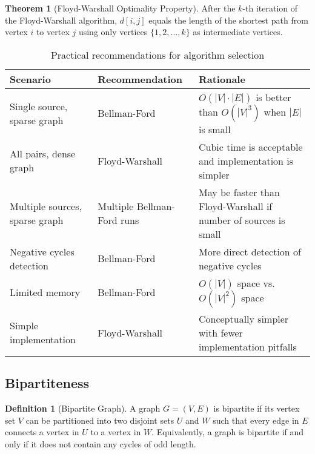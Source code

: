 \documentclass{article}
\theoremstyle{definition}
\newtheorem{theorem}{Theorem}
\newtheorem{definition}{Definition}
\begin{document}
\begin{theorem}[Floyd-Warshall Optimality Property]
After the $k$-th iteration of the Floyd-Warshall algorithm, $d[i,j]$ equals the length of the shortest path from vertex $i$ to vertex $j$ using only vertices $\{1, 2, \ldots, k\}$ as intermediate vertices.
\end{theorem}

\begin{table}[h]
\centering
\begin{tabular}{|p{3cm}|p{5.5cm}|p{5.5cm}|}
\hline
\textbf{Scenario} & \textbf{Recommendation} & \textbf{Rationale} \\
\hline
Single source, sparse graph & Bellman-Ford & $O(|V| \cdot |E|)$ is better than $O(|V|^3)$ when $|E|$ is small \\
\hline
All pairs, dense graph & Floyd-Warshall & Cubic time is acceptable and implementation is simpler \\
\hline
Multiple sources, sparse graph & Multiple Bellman-Ford runs & May be faster than Floyd-Warshall if number of sources is small \\
\hline
Negative cycles detection & Bellman-Ford & More direct detection of negative cycles \\
\hline
Limited memory & Bellman-Ford & $O(|V|)$ space vs. $O(|V|^2)$ space \\
\hline
Simple implementation & Floyd-Warshall & Conceptually simpler with fewer implementation pitfalls \\
\hline
\end{tabular}
\caption{Practical recommendations for algorithm selection}
\end{table}

\pagebreak
\newpage


\subsection{Bipartiteness}

\begin{definition}[Bipartite Graph]
A graph $G = (V, E)$ is bipartite if its vertex set $V$ can be partitioned into two disjoint sets $U$ and $W$ such that every edge in $E$ connects a vertex in $U$ to a vertex in $W$. Equivalently, a graph is bipartite if and only if it does not contain any cycles of odd length.
\end{definition}
\end{document}
